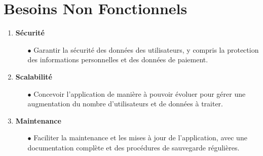 \documentclass[a4paper,12pt]{report}
\numberwithin{equation}{section}
\begin{document}
\section{Besoins Non Fonctionnels}
\vspace{0.5cm}
\begin{enumerate}
    \item \textbf{Sécurité}
    \begin{itemize}
        \item[$\bullet$] Garantir la sécurité des données des utilisateurs, y compris la protection des informations personnelles et des données de paiement.
    \end{itemize}
    \item \textbf{Scalabilité}
    \begin{itemize}
        \item[$\bullet$] Concevoir l'application de manière à pouvoir évoluer pour gérer une augmentation du nombre d'utilisateurs et de données à traiter.
    \end{itemize}
    \item \textbf{Maintenance}
    \begin{itemize}
        \item[$\bullet$] Faciliter la maintenance et les mises à jour de l'application, avec une documentation complète et des procédures de sauvegarde régulières.
    \end{itemize}
\end{enumerate}

\newpage
\end{document}
